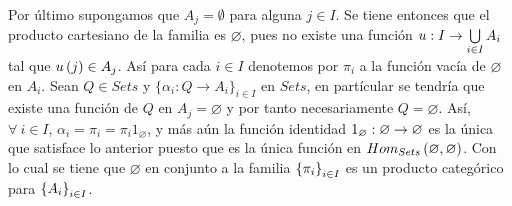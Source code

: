 \documentclass{article}
\begin{document}
	Por último supongamos que $A_j=\emptyset$ para alguna $j\in I$. Se tiene entonces que el producto cartesiano de la familia es $\varnothing$, pues no existe una función $\catarrow{u}{I}{\bigcup\limits_{i\in I}A_i}{}$ tal que $u\left(j\right)\in A_j$. Así para cada $i\in I$ denotemos por $\pi_i$ a la función vacía de $\varnothing$ en $A_i$. Sean $Q\in Sets$ y $\{\alpha_i:Q\to A_i\}_{i\in I}$ en $Sets$, en partícular se tendría que existe una función de $Q$ en $A_j=\varnothing$ y por tanto necesariamente $Q=\varnothing$. Así, $\forall\ i\in I$, $\alpha_i=\pi_i=\pi_i1_\varnothing $, y más aún la función identidad $\catarrow{1_\varnothing}{\varnothing}{\varnothing}{}$ es la única que satisface lo anterior puesto que es la única función en $Hom_{Sets}\left(\varnothing,\varnothing\right)$. Con lo cual se tiene que $\varnothing$ en conjunto a la familia $\left\{\pi_i\right\}_{i\in I}$ es un producto categórico para ${\left\{{A}_{i}\right\}}_{i\in I}$.	
\end{document}

